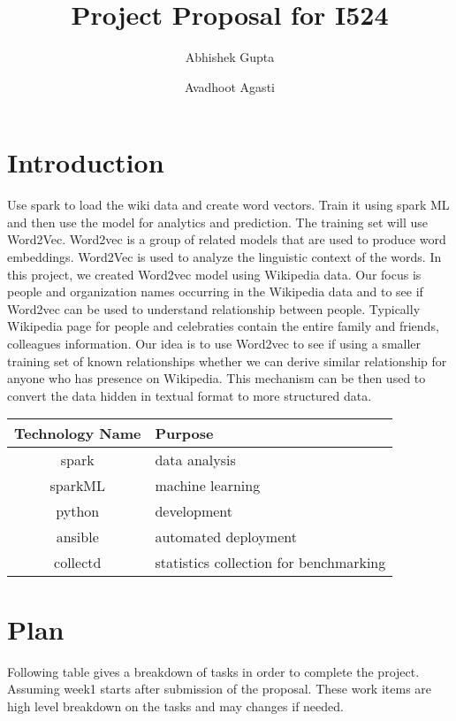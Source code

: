 \documentclass[9pt,twocolumn,twoside]{styles/osajnl}
\title{Project Proposal for I524}
\author[1,*]{Abhishek Gupta}
\author[1, **]{Avadhoot Agasti}
\affil[1]{School of Informatics and Computing, Bloomington, IN 47408, U.S.A.}
\affil[*]{Corresponding authors: abhigupt@iu.edu}
\affil[**]{Corresponding authors: aagasti@iu.edu}
\begin{document}
\maketitle

\tableofcontents

\section{Introduction}

Use spark \cite{www-spark-python} to load the wiki data and create word vectors. Train it using spark ML  \cite{www-sparkml} and then use the model for analytics and prediction. The training set will use Word2Vec. Word2vec \cite{www-word2vec} is a group of related models that are used to produce word embeddings. Word2Vec is used to analyze the linguistic context of the words. In this project, we created Word2vec model using Wikipedia data. Our focus is people and organization names occurring in the Wikipedia data and to see if Word2vec can be used to understand relationship between people. Typically Wikipedia page for people and celebraties contain the entire family and friends, colleagues information. Our idea is to use Word2vec to see if using a smaller training set of known relationships whether we can derive similar relationship for anyone who has presence on Wikipedia. This mechanism can be then used to convert the data hidden in textual format to more structured data. 

\begin{center}
 \begin{tabular}{||c l||} 
 \hline
 Technology Name & Purpose  \\ [0.5ex] 
 \hline\hline
 spark \cite{www-spark-python} & data analysis  \\
 \hline
 sparkML \cite{www-sparkml} & machine learning  \\
 \hline
 python \cite{www-spark-python} & development \\
 \hline
 ansible \cite{www-ansible} & automated deployment \\
 \hline
 collectd \cite{www-collectd} & statistics collection for benchmarking \\
 \hline
\end{tabular}
\end{center}

\section{Plan}
Following table gives a breakdown of tasks in order to complete the project. Assuming week1 starts after submission of the proposal. These work items are high level breakdown on the tasks and may changes if needed.
\end{document}
